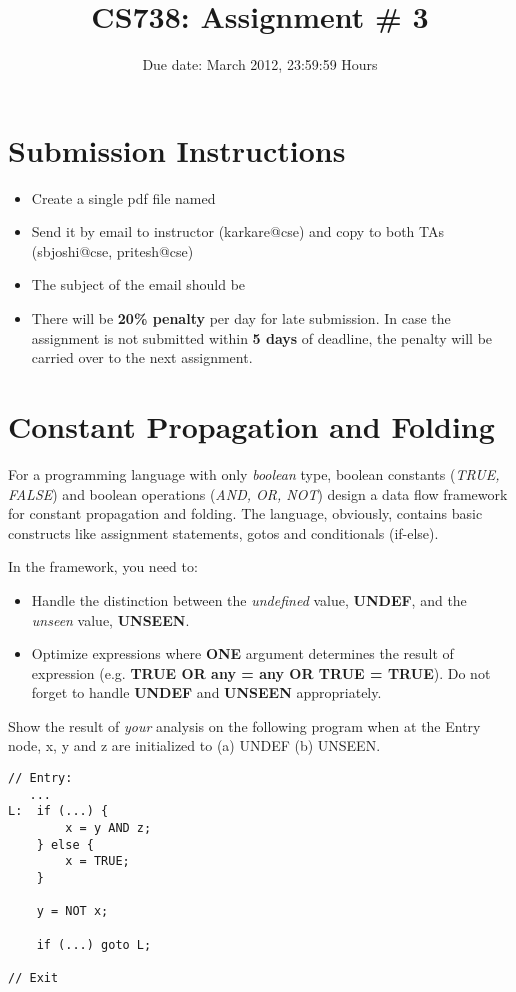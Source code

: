 \documentclass[a4paper,11pt]{article}%
\begin{document}
\title{CS738: Assignment \# 3}
\author{}
\date{Due date: { March 2012, 23:59:59 Hours}}
\maketitle
\section*{Submission Instructions}
\begin{itemize}
\item Create a single pdf file named
\item Send it by email to instructor (karkare@cse) and copy
  to both TAs (sbjoshi@cse, pritesh@cse)
\item The subject of the email should be
\item There will be {\bf 20\% penalty} per day for late
  submission. In case the assignment is not submitted within
  {\bf 5 days} of deadline, the penalty will be carried over to the
  next assignment. 
\end{itemize}
\section{Constant Propagation and Folding}
For a programming language with only {\em boolean} type,
boolean constants ({\em TRUE, FALSE}) and boolean  operations
({\em AND, OR, NOT}) design a data flow framework for
constant propagation and folding. The language, obviously,
contains basic constructs like assignment statements, gotos
and conditionals (if-else). 

In the framework, you need to:
\begin{itemize}
\item Handle the distinction between the {\em undefined}
  value, {\bf UNDEF}, and the {\em unseen} value, {\bf
    UNSEEN}.
\item Optimize expressions where {\bf ONE} argument
  determines the result of expression (e.g. {\bf TRUE OR any
    =  any OR TRUE = TRUE}). Do not forget to handle {\bf
    UNDEF} and {\bf UNSEEN} appropriately.
\end{itemize}
Show the result of {\em your} analysis on the following
  program when at the Entry node, x, y and z are initialized
  to (a) UNDEF (b) UNSEEN.
\begin{verbatim}
// Entry:
   ...
L:  if (...) {
        x = y AND z;                   
    } else {
        x = TRUE;
    }

    y = NOT x; 

    if (...) goto L;

// Exit
\end{verbatim}
\end{document}
